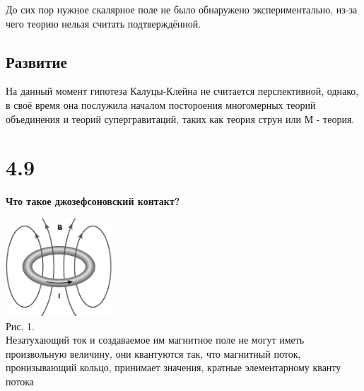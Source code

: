 \documentclass[a4paper,14pt]{article}
\begin{document}
	До сих пор нужное скалярное поле не было обнаружено экспериментально, из-за чего теорию нельзя считать подтверждённой.

\subsection*{Развитие}

	На данный момент гипотеза Калуцы-Клейна не считается перспективной, однако, в своё время она послужила началом постороения многомерных теорий объединения и теорий супергравитаций, таких как теория струн или М - теория.


\section*{4.9}

\begin{center}
	\LARGE{\textbf{Что такое джозефсоновский контакт?}}\\
\end{center}

\begin{center}
	\includegraphics[width=0.3\textwidth]{4_9_0}\\
	Рис. 1.\\
	Незатухающий ток и создаваемое им магнитное поле не могут иметь произвольную величину, они квантуются так, что магнитный поток, пронизывающий кольцо, принимает значения, кратные элементарному кванту потока
\end{center}
\end{document}

